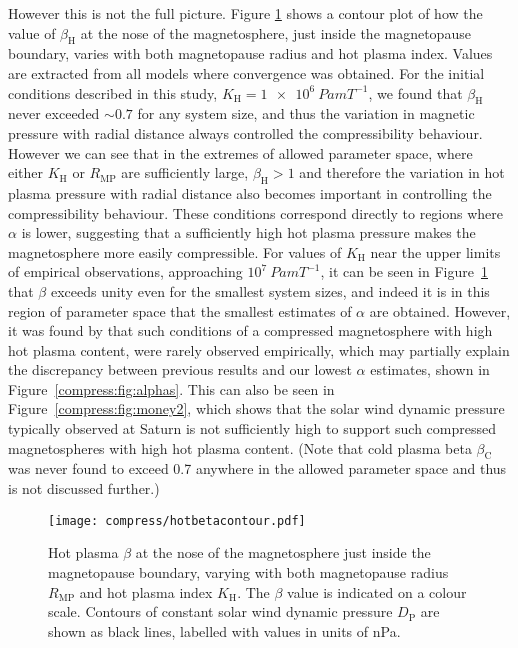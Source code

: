 However this is not the full picture. Figure \ref{compress:fig:hotbetacontour} shows a contour plot of how the value of $\beta_\mathrm{H}$ at the nose of the magnetosphere, just inside the magnetopause boundary, varies with both magnetopause radius and hot plasma index. Values are extracted from all models where convergence was obtained. For the initial conditions described in this study, $K_\mathrm{H}=\SI{1e6}{Pa m T^{-1}}$, we found that $\beta_\mathrm{H}$ never exceeded ${\sim}0.7$ for any system size, and thus the variation in magnetic pressure with radial distance always controlled the compressibility behaviour. However we can see that in the extremes of allowed parameter space, where either $K_\mathrm{H}$ or $R_\mathrm{MP}$ are sufficiently large, $\beta_\mathrm{H} > 1$ and therefore the variation in hot plasma pressure with radial distance also becomes important in controlling the compressibility behaviour. These conditions correspond directly to regions where $\alpha$ is lower, suggesting that a sufficiently high hot plasma pressure makes the magnetosphere more easily compressible. For values of $K_\mathrm{H}$ near the upper limits of empirical observations, approaching $10^7~\si{Pa m T^{-1}}$, it can be seen in Figure~\ref{compress:fig:hotbetacontour} that $\beta$ exceeds unity even for the smallest system sizes, and indeed it is in this region of parameter space that the smallest estimates of $\alpha$ are obtained. However, it was found by \citet{pilkington2015} that such conditions of a compressed magnetosphere with high hot plasma content, were rarely observed empirically, which may partially explain the discrepancy between previous results and our lowest $\alpha$ estimates, shown in Figure~\ref{compress:fig:alphas}. This can also be seen in Figure~\ref{compress:fig:money2}, which shows that the solar wind dynamic pressure typically observed at Saturn is not sufficiently high to support such compressed magnetospheres with high hot plasma content. (Note that cold plasma beta $\beta_\mathrm{C}$ was never found to exceed 0.7 anywhere in the allowed parameter space and thus is not discussed further.)
\begin{figure}
\centering
\noindent\texttt{[image: compress/hotbetacontour.pdf]}
\caption[Map of hot plasma $\beta$ just inside the magnetopause boundary in system size, $K_\mathrm{H}$ parameter space.]{Hot plasma $\beta$ at the nose of the magnetosphere just inside the magnetopause boundary, varying with both magnetopause radius $R_\mathrm{MP}$ and hot plasma index $K_\mathrm{H}$. The $\beta$ value is indicated on a colour scale. Contours of constant solar wind dynamic pressure $D_\mathrm{P}$ are shown as black lines, labelled with values in units of nPa.}
\label{compress:fig:hotbetacontour}
\end{figure}

